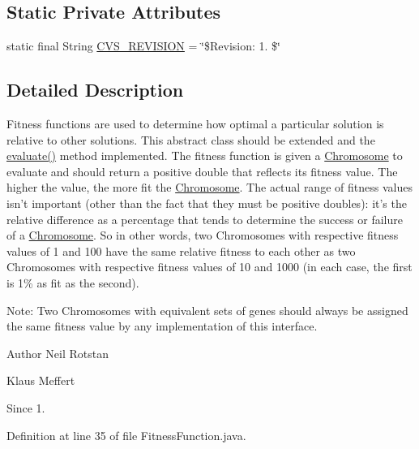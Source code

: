 \subsection*{Static Private Attributes}
\begin{DoxyCompactItemize}
\item 
static final String \hyperlink{classorg_1_1jgap_1_1_fitness_function_ab4a9c34ed3bbaabed749120536d897ba}{C\-V\-S\-\_\-\-R\-E\-V\-I\-S\-I\-O\-N} = \char`\"{}\$Revision\-: 1. \$\char`\"{}
\end{DoxyCompactItemize}


\subsection{Detailed Description}
Fitness functions are used to determine how optimal a particular solution is relative to other solutions. This abstract class should be extended and the \hyperlink{classorg_1_1jgap_1_1_fitness_function_a0078e42480eac93729f906ac4dc185d9}{evaluate()} method implemented. The fitness function is given a \hyperlink{classorg_1_1jgap_1_1_chromosome}{Chromosome} to evaluate and should return a positive double that reflects its fitness value. The higher the value, the more fit the \hyperlink{classorg_1_1jgap_1_1_chromosome}{Chromosome}. The actual range of fitness values isn't important (other than the fact that they must be positive doubles)\-: it's the relative difference as a percentage that tends to determine the success or failure of a \hyperlink{classorg_1_1jgap_1_1_chromosome}{Chromosome}. So in other words, two Chromosomes with respective fitness values of 1 and 100 have the same relative fitness to each other as two Chromosomes with respective fitness values of 10 and 1000 (in each case, the first is 1\% as fit as the second). 

Note\-: Two Chromosomes with equivalent sets of genes should always be assigned the same fitness value by any implementation of this interface.

\begin{DoxyAuthor}{Author}
Neil Rotstan 

Klaus Meffert 
\end{DoxyAuthor}
\begin{DoxySince}{Since}
1. 
\end{DoxySince}


Definition at line 35 of file Fitness\-Function.\-java.




